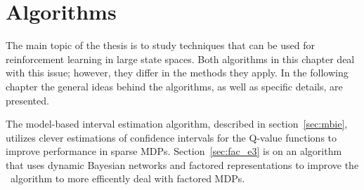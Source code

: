 \chapter{Algorithms}
\label{ch:algo}

The main topic of the thesis is to study techniques that can be used for
reinforcement learning in large state spaces. Both algorithms in this chapter deal with this
issue; however, they differ in the methods they apply. In the following chapter
the general ideas behind the algorithms, as well as specific details, are
presented. 

The model-based interval estimation algorithm, described in
section~\ref{sec:mbie}, utilizes clever estimations of confidence intervals for
the Q-value functions to improve performance in sparse MDPs.
Section~\ref{sec:fac_e3} is on an algorithm that uses dynamic Bayesian networks
and factored representations to improve the \etre\ algorithm to more efficently
deal with factored MDPs. 



